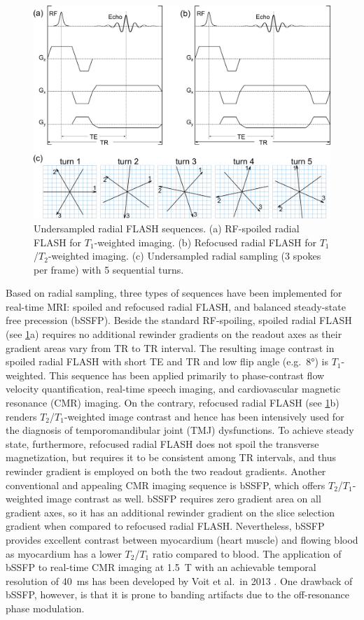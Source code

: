\begin{figure}[tb]
  \centering
  \includegraphics[width = 1.0\textwidth]{fig/rtmri-seq-rad.png}
  \caption{Undersampled radial FLASH sequences. (a) RF-spoiled radial FLASH for $T_1$-weighted imaging. (b) Refocused radial FLASH for $T_1$/$T_2$-weighted imaging. (c) Undersampled radial sampling (3 spokes per frame) with 5 sequential turns.} \label{Fig:rtmri-seq-rad}
\end{figure}
Based on radial sampling, three types of sequences have been implemented for real-time MRI: spoiled and refocused radial FLASH, and balanced steady-state free precession (\acs{bSSFP}). Beside the standard \acs{RF}-spoiling, spoiled radial FLASH (see \cref{Fig:rtmri-seq-rad}a) requires no additional rewinder gradients on the readout axes as their gradient areas vary from \acs{TR} to TR interval. The resulting image contrast in spoiled radial FLASH with short \acs{TE} and TR and low flip angle (e.g.~\ang{8}) is $T_1$-weighted. This sequence has been applied primarily to phase-contrast flow velocity quantification, real-time speech imaging, and cardiovascular magnetic resonance (\acs{CMR}) imaging. On the contrary, refocused radial FLASH (see \cref{Fig:rtmri-seq-rad}b) renders $T_2$/$T_1$-weighted image contrast and hence has been intensively used for the diagnosis of temporomandibular joint (TMJ) dysfunctions. To achieve steady state, furthermore, refocused radial FLASH does not spoil the transverse magnetization, but requires it to be consistent among TR intervals, and thus rewinder gradient is employed on both the two readout gradients. Another conventional and appealing CMR imaging sequence is \acs{bSSFP}, which offers $T_2$/$T_1$-weighted image contrast as well. bSSFP requires zero gradient area on all gradient axes, so it has an additional rewinder gradient on the slice selection gradient when compared to refocused radial FLASH. Nevertheless, bSSFP provides excellent contrast between myocardium (heart muscle) and flowing blood as myocardium has a lower $T_2$/$T_1$ ratio compared to blood. The application of bSSFP to real-time CMR imaging at \SI{1.5}{\tesla} with an achievable temporal resolution of \SI{40}{\ms} has been developed by Voit et al.~in 2013 \cite{2013_SSFP_Voit}. One drawback of bSSFP, however, is that it is prone to banding artifacts due to the off-resonance phase modulation. 

